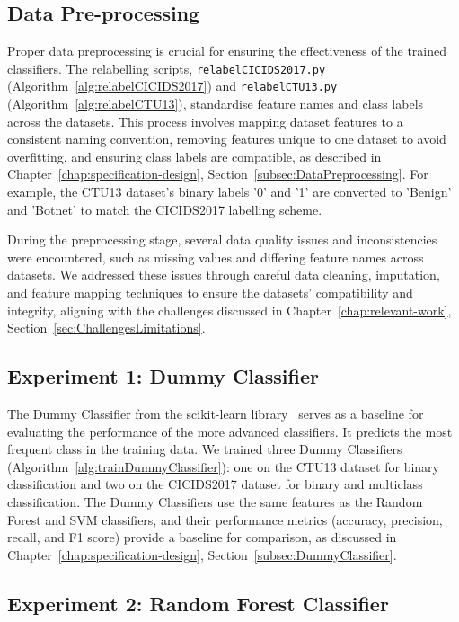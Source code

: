 \subsection{Data Pre-processing}\label{subsec:pre-processing}

Proper data preprocessing is crucial for ensuring the effectiveness of the trained classifiers. The relabelling scripts, \texttt{relabelCICIDS2017.py} (Algorithm~\ref{alg:relabelCICIDS2017}) and \texttt{relabelCTU13.py} (Algorithm~\ref{alg:relabelCTU13}), standardise feature names and class labels across the datasets. This process involves mapping dataset features to a consistent naming convention, removing features unique to one dataset to avoid overfitting, and ensuring class labels are compatible, as described in Chapter~\ref{chap:specification-design}, Section~\ref{subsec:DataPreprocessing}. For example, the CTU13 dataset's binary labels '0' and '1' are converted to 'Benign' and 'Botnet' to match the CICIDS2017 labelling scheme.

During the preprocessing stage, several data quality issues and inconsistencies were encountered, such as missing values and differing feature names across datasets. We addressed these issues through careful data cleaning, imputation, and feature mapping techniques to ensure the datasets' compatibility and integrity, aligning with the challenges discussed in Chapter~\ref{chap:relevant-work}, Section~\ref{sec:ChallengesLimitations}.

\subsection{Experiment 1: Dummy Classifier}\label{subsec:baseline-performance}

The Dummy Classifier from the scikit-learn library~\cite{pedregosa2011scikit} serves as a baseline for evaluating the performance of the more advanced classifiers. It predicts the most frequent class in the training data. We trained three Dummy Classifiers (Algorithm~\ref{alg:trainDummyClassifier}): one on the CTU13 dataset for binary classification and two on the CICIDS2017 dataset for binary and multiclass classification. The Dummy Classifiers use the same features as the Random Forest and SVM classifiers, and their performance metrics (accuracy, precision, recall, and F1 score) provide a baseline for comparison, as discussed in Chapter~\ref{chap:specification-design}, Section~\ref{subsec:DummyClassifier}.

\subsection{Experiment 2: Random Forest Classifier}\label{subsec:random-forest-classifier}

